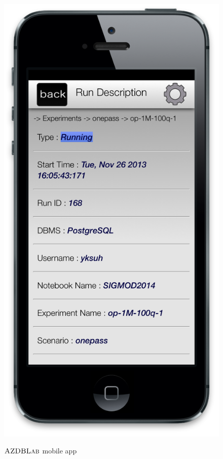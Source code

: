 \documentclass{vldb}
\def\azdb{\hbox{\sc AZDBLab}}
\begin{document}
\begin{figure}[htp!]
{		\includegraphics[scale=0.17]{./figures/run_description}
		\label{fig:exp_details}
	}
	\vspace{-0.1in}
	\caption{$\azdb$ mobile app\label{fig:mobile_app}}
\end{figure}
\end{document}
